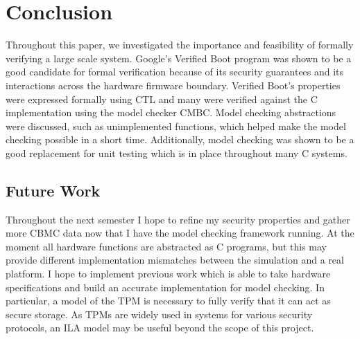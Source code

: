 \documentclass[../report.tex]{subfiles}
\begin{document}
\onehalfspacing

\section{Conclusion}

Throughout this paper, we investigated the importance and feasibility of formally verifying a large scale system.
Google's Verified Boot program was shown to be a good candidate for formal verification because of its security guarantees and its interactions across the hardware firmware boundary.
Verified Boot's properties were expressed formally using CTL and many were verified against the C implementation using the model checker CMBC\@. 
Model checking abstractions were discussed, such as unimplemented functions, which helped make the model checking possible in a short time. 
Additionally, model checking was shown to be a good replacement for unit testing which is in place throughout many C systems.

\subsection{Future Work}

Throughout the next semester I hope to refine my security properties and gather more CBMC data now that I have the model checking framework running.
At the moment all hardware functions are abstracted as C programs, but this may provide different implementation mismatches between the simulation and a real platform.
I hope to implement previous work which is able to take hardware specifications and build an accurate implementation for model checking\cite{ila}.
In particular, a model of the TPM is necessary to fully verify that it can act as secure storage.
As TPMs are widely used in systems for various security protocols, an ILA model may be useful beyond the scope of this project.
\end{document}
